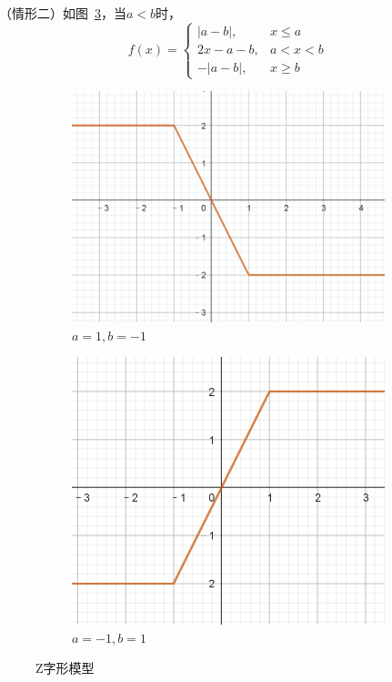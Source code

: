 \documentclass[a4paper,openany]{ctexbook}
\begin{document}
（情形二）如图~\ref{a8b3197b-0756-47ac-b002-05f20349e2e4}，当\(a<b\)时，
\[f(x)=
    \begin{cases}
        |a-b|,  & x\le a \\
        2x-a-b, & a<x<b  \\
        -|a-b|, & x\ge b
    \end{cases}
\]

\begin{figure}
    \centering
    \begin{subfigure}{0.45\textwidth}
        \centering
        \includegraphics[width=\textwidth]{image18.png}
        \caption{$a=1,b=-1$}\label{db33b811-305c-4344-8c3f-90fdf39d069b}
    \end{subfigure}
    \hfill
    \begin{subfigure}{0.45\textwidth}
        \centering
        \includegraphics[width=\textwidth]{image19.png}
        \caption{$a=-1,b=1$}\label{a8b3197b-0756-47ac-b002-05f20349e2e4}
    \end{subfigure}
    \caption{Z字形模型}
\end{figure}
\end{document}
